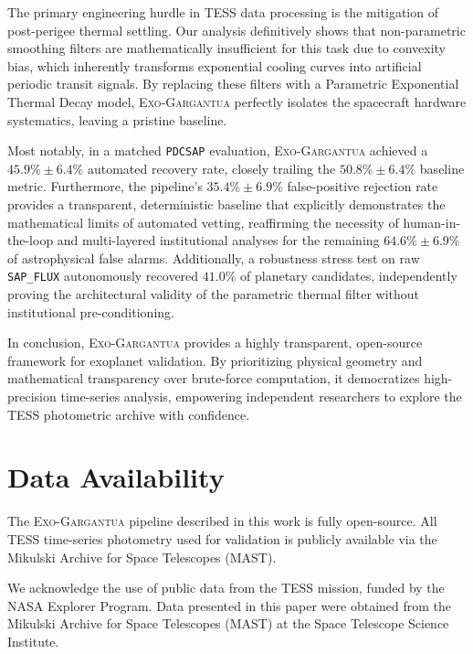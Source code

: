 \documentclass[twocolumn,linenumbers]{aastex701}
\begin{document}
The primary engineering hurdle in TESS data processing is the mitigation of post-perigee thermal settling. Our analysis definitively shows that non-parametric smoothing filters are mathematically insufficient for this task due to convexity bias, which inherently transforms exponential cooling curves into artificial periodic transit signals. By replacing these filters with a Parametric Exponential Thermal Decay model, \textsc{Exo-Gargantua} perfectly isolates the spacecraft hardware systematics, leaving a pristine baseline.

Most notably, in a matched \texttt{PDCSAP} evaluation, \textsc{Exo-Gargantua} achieved a $45.9\% \pm 6.4\%$ automated recovery rate, closely trailing the $50.8\% \pm 6.4\%$ baseline metric. Furthermore, the pipeline's $35.4\% \pm 6.9\%$ false-positive rejection rate provides a transparent, deterministic baseline that explicitly demonstrates the mathematical limits of automated vetting, reaffirming the necessity of human-in-the-loop and multi-layered institutional analyses for the remaining $64.6\% \pm 6.9\%$ of astrophysical false alarms. Additionally, a robustness stress test on raw \texttt{SAP\_FLUX} autonomously recovered $41.0\%$ of planetary candidates, independently proving the architectural validity of the parametric thermal filter without institutional pre-conditioning.

In conclusion, \textsc{Exo-Gargantua} provides a highly transparent, open-source framework for exoplanet validation. By prioritizing physical geometry and mathematical transparency over brute-force computation, it democratizes high-precision time-series analysis, empowering independent researchers to explore the TESS photometric archive with confidence.

\section*{Data Availability}
The \textsc{Exo-Gargantua} pipeline described in this work is fully open-source. All TESS time-series photometry used for validation is publicly available via the Mikulski Archive for Space Telescopes (MAST).



\begin{acknowledgments}
We acknowledge the use of public data from the TESS mission, funded by the NASA Explorer Program. Data presented in this paper were obtained from the Mikulski Archive for Space Telescopes (MAST) at the Space Telescope Science Institute.
\end{acknowledgments}
\end{document}
